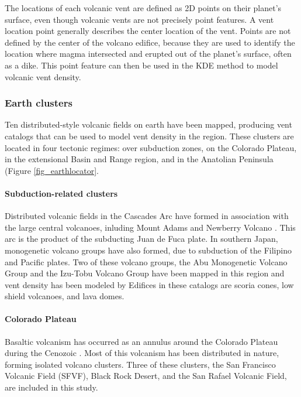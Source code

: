 \documentclass[12pt,letter]{article}
\begin{document}
The locations of each volcanic vent are defined as 2D points on their planet's surface, even though volcanic vents are not precisely point features. A vent location point generally describes the center location of the vent. Points are not defined by the center of the volcano edifice, because they are used to identify the location where magma intersected and erupted out of the planet's surface, often as a dike. This point feature can then be used in the KDE method to model volcanic vent density.

\subsubsection{Earth clusters}
Ten distributed-style volcanic fields on earth have been mapped, producing vent catalogs that can be used to model vent density in the region. These clusters are located in four tectonic regimes: over subduction zones, on the Colorado Plateau, in the extensional Basin and Range region, and in the Anatolian Peninsula (Figure \ref{fig_earthlocator}.

\paragraph{Subduction-related clusters} Distributed volcanic fields in the Cascades Arc have formed in association with the large central volcanoes, inluding Mount Adams \citep{Barron2014} and Newberry Volcano \citep{Bard2013}. This arc is the product of the subducting Juan de Fuca plate. In southern Japan, monogenetic volcano groups have also formed, due to subduction of the Filipino and Pacific plates. Two of these volcano groups, the Abu Monogenetic Volcano Group and the Izu-Tobu Volcano Group have been mapped in this region \citep{Kiyosugi2010} and vent density has been modeled by \citet{Kiyosugi2012} Edifices in these catalogs are scoria cones, low shield volcanoes, and lava domes.

\paragraph{Colorado Plateau} Basaltic volcanism has occurred as an annulus around the Colorado Plateau during the Cenozoic \citep{Tanaka1986}. Most of this volcanism has been distributed in nature, forming isolated volcano clusters. Three of these clusters, the San Francisco Volcanic Field (SFVF), Black Rock Desert, and the San Rafael Volcanic Field, are included in this study. 
\end{document}
